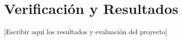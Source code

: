 \chapter{Verificación y Resultados}
\label{ch:resultados-y-evaluacion}

[Escribir aquí los resultados y evaluación del proyecto]
